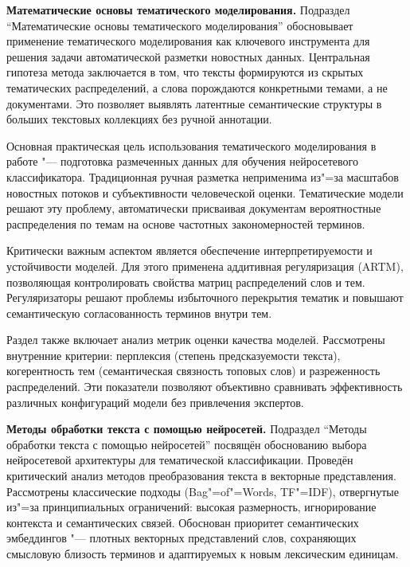 \documentclass[autoref]{SCWorks}
\begin{document}
\textbf{Математические основы тематического моделирования.}
Подраздел \enquote{Математические основы тематического моделирования}
обосновывает применение тематического моделирования как ключевого инструмента
для решения задачи автоматической разметки новостных данных. Центральная
гипотеза метода заключается в том, что тексты формируются из скрытых
тематических распределений, а слова порождаются конкретными темами, а не
документами. Это позволяет выявлять латентные семантические структуры в больших
текстовых коллекциях без ручной аннотации.

Основная практическая цель использования тематического моделирования в работе
"--- подготовка размеченных данных для обучения нейросетевого классификатора.
Традиционная ручная разметка неприменима из"=за масштабов новостных потоков и
субъективности человеческой оценки. Тематические модели решают эту проблему,
автоматически присваивая документам вероятностные распределения по темам на
основе частотных закономерностей терминов.

Критически важным аспектом является обеспечение интерпретируемости и
устойчивости моделей. Для этого применена аддитивная регуляризация (ARTM),
позволяющая контролировать свойства матриц распределений слов и тем.
Регуляризаторы решают проблемы избыточного перекрытия тематик и повышают
семантическую согласованность терминов внутри тем.

Раздел также включает анализ метрик оценки качества моделей. Рассмотрены
внутренние критерии: перплексия (степень предсказуемости текста), когерентность
тем (семантическая связность топовых слов) и разреженность распределений. Эти
показатели позволяют объективно сравнивать эффективность различных конфигураций
модели без привлечения экспертов.

\textbf{Методы обработки текста с помощью нейросетей.}
Подраздел \enquote{Методы обработки текста с помощью нейросетей} посвящён
обоснованию выбора нейросетевой архитектуры для тематической классификации.
Проведён критический анализ методов преобразования текста в векторные
представления. Рассмотрены классические подходы (Bag"=of"=Words, TF"=IDF),
отвергнутые из"=за принципиальных ограничений: высокая размерность,
игнорирование контекста и семантических связей. Обоснован приоритет
семантических эмбеддингов "--- плотных векторных представлений слов, сохраняющих
смысловую близость терминов и адаптируемых к новым лексическим единицам.
\end{document}
